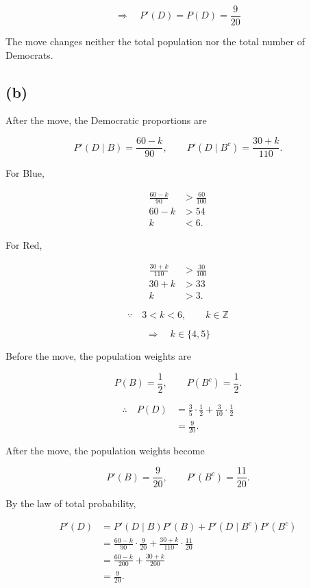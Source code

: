 \documentclass[11pt,a4paper]{article}
\begin{document}
\[
\Longrightarrow\quad
P'(D)=P(D)=\frac9{20}
\]

The move changes neither the total population
nor the total number of Democrats.

\subsection*{(b)}

After the move, the Democratic proportions are

\[
P'(D\mid B)=\frac{60-k}{90},
\qquad
P'(D\mid B^c)=\frac{30+k}{110}.
\]

For Blue,

\[
\begin{aligned}
\frac{60-k}{90}&>\frac{60}{100}\\
60-k&>54\\
k&<6.
\end{aligned}
\]

For Red,

\[
\begin{aligned}
\frac{30+k}{110}&>\frac{30}{100}\\
30+k&>33\\
k&>3.
\end{aligned}
\]

\[
\because\quad
3<k<6,\qquad k\in\mathbb Z
\]

\[
\Longrightarrow\quad
k\in\{4,5\}
\]

Before the move, the population weights are

\[
P(B)=\frac12,
\qquad
P(B^c)=\frac12.
\]

\[
\begin{aligned}
\therefore\quad P(D)
&=\frac35\cdot\frac12
 +\frac3{10}\cdot\frac12\\
&=\frac9{20}.
\end{aligned}
\]

After the move, the population weights become

\[
P'(B)=\frac9{20},
\qquad
P'(B^c)=\frac{11}{20}.
\]

By the law of total probability,

\[
\begin{aligned}
P'(D)
&=P'(D\mid B)P'(B)
 +P'(D\mid B^c)P'(B^c)\\
&=\frac{60-k}{90}\cdot\frac9{20}
 +\frac{30+k}{110}\cdot\frac{11}{20}\\
&=\frac{60-k}{200}
 +\frac{30+k}{200}\\
&=\frac9{20}.
\end{aligned}
\]
\end{document}
